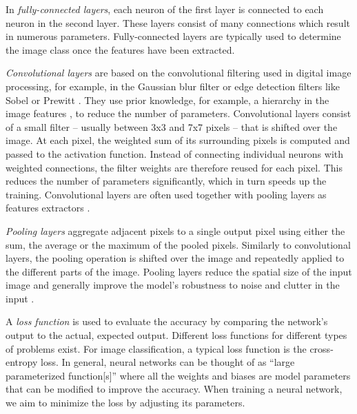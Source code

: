 \documentclass[conference,compsoc,a4paper]{IEEEtran}
\begin{document}
In \emph{fully-connected layers}, each neuron of the first layer is connected to each neuron in the second layer.
These layers consist of many connections which result in numerous parameters.
Fully-connected layers are typically used to determine the image class once the features have been extracted.

\emph{Convolutional layers} are based on the convolutional filtering used in digital image processing, for example, in the Gaussian blur filter or edge detection filters like Sobel or Prewitt \cite{Stockman:2001:CV:558008}.
They use prior knowledge, for example, a hierarchy in the image features \cite{lecun2010convolutional}, to reduce the number of parameters.
Convolutional layers consist of a small filter -- usually between 3x3 and 7x7 pixels -- that is shifted over the image.
At each pixel, the weighted sum of its surrounding pixels is computed and passed to the activation function.
Instead of connecting individual neurons with weighted connections, the filter weights are therefore reused for each pixel.
This reduces the number of parameters significantly, which in turn speeds up the training.
Convolutional layers are often used together with pooling layers as features extractors \cite{lecun2010convolutional}.

\emph{Pooling layers} aggregate adjacent pixels to a single output pixel using either the sum, the average or the maximum of the pooled pixels.
Similarly to convolutional layers, the pooling operation is shifted over the image and repeatedly applied to the different parts of the image.
Pooling layers reduce the spatial size of the input image and generally improve the model's robustness to noise and clutter in the input \cite{lecun2010convolutional,chilimbi2014-Project-Adam}.

A \emph{loss function} is used to evaluate the accuracy by comparing the network's output to the actual, expected output.
Different loss functions for different types of problems exist.
For image classification, a typical loss function is the cross-entropy loss.
%
In general, neural networks can be thought of as ``large parameterized function[s]'' \cite{paine2013-GPU-async-SGD} where all the weights and biases are model parameters that can be modified to improve the accuracy.
When training a neural network, we aim to minimize the loss by adjusting its parameters.
\end{document}
